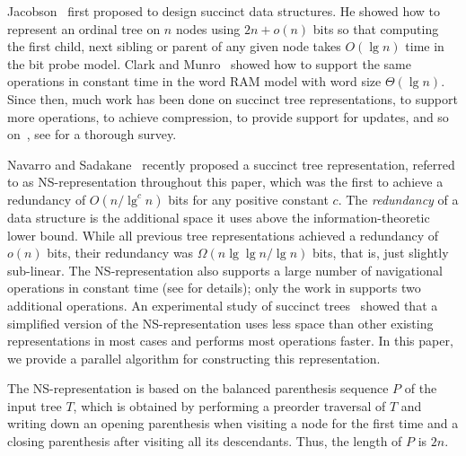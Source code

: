 Jacobson~\cite{j1989} first proposed to design succinct data
structures.  He showed how to represent an ordinal tree on $n$ nodes
using $2n+o(n)$ bits so that computing the first child, next sibling
or parent of any given node takes $O(\lg n)$ time in the bit probe
model.  Clark and Munro~\cite{cm1996} showed how to support the same
operations in constant time in the word RAM model with word size
$\Theta(\lg n)$.  Since then, much work has been done on succinct tree
representations, to support more operations, to achieve compression,
to provide support for updates, and so
on~\cite{mr1997,bdmr1999,grr2004,jss2007,ly2008,hms2012,fm2014,Navarro:2014:FFS:2620785.2601073},
see \cite{rr2013} for a thorough survey.

Navarro and Sadakane~\cite{Navarro:2014:FFS:2620785.2601073} recently
proposed a succinct tree representation, referred to as
NS-representation throughout this paper, which was the first to
achieve a redundancy of $O(n/\lg^c n)$ bits for any positive constant
$c$.  The \emph{redundancy} of a data structure is the additional
space it uses above the information-theoretic lower bound.  While all
previous tree representations achieved a redundancy of $o(n)$ bits,
their redundancy was $\Omega(n \lg\lg n / \lg n)$ bits, that is, just
slightly sub-linear.  The NS-representation also supports a large
number of navigational operations in constant time (see
\cite{Navarro:2014:FFS:2620785.2601073} for details); only the work in
\cite{hms2012,fm2014} supports two additional operations.  An
experimental study of succinct trees~\cite{ACNSalenex10} showed that a
simplified version of the NS-representation uses less space than other
existing representations in most cases and performs most operations
faster.  In this paper, we provide a parallel algorithm for
constructing this representation.

The NS-representation is based on the balanced parenthesis sequence
$P$ of the input tree $T$, which is obtained by performing a preorder
traversal of $T$ and writing down an opening parenthesis when visiting
a node for the first time and a closing parenthesis after visiting all
its descendants.  Thus, the length of $P$ is $2n$.

